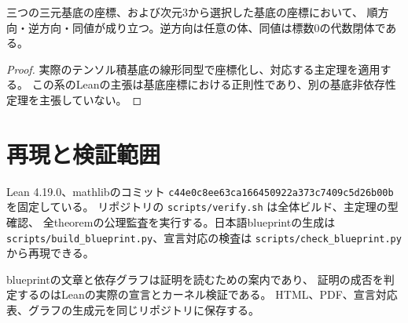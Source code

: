\begin{corollary}[任意の三つの三次元因子への接続]\label{cor:bases}
\leanok
{}
三つの三元基底の座標、および次元3から選択した基底の座標において、
順方向・逆方向・同値が成り立つ。逆方向は任意の体、同値は標数0の代数閉体である。
\end{corollary}
\begin{proof}\leanok
実際のテンソル積基底の線形同型で座標化し、対応する主定理を適用する。
この系のLeanの主張は基底座標における正則性であり、別の基底非依存性定理を主張していない。
\end{proof}

\section{再現と検証範囲}

Lean 4.19.0、mathlibのコミット
\texttt{c44e0c8ee63ca166450922a373c7409c5d26b00b} を固定している。
リポジトリの \texttt{scripts/verify.sh} は全体ビルド、主定理の型確認、
全theoremの公理監査を実行する。日本語blueprintの生成は
\texttt{scripts/build\_blueprint.py}、宣言対応の検査は
\texttt{scripts/check\_blueprint.py} から再現できる。

blueprintの文章と依存グラフは証明を読むための案内であり、
証明の成否を判定するのはLeanの実際の宣言とカーネル検証である。
HTML、PDF、宣言対応表、グラフの生成元を同じリポジトリに保存する。
